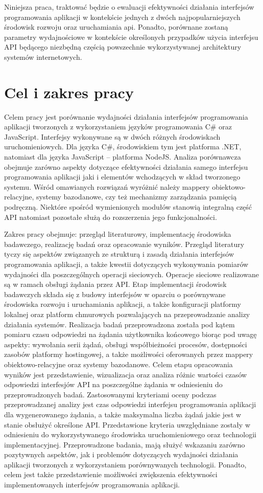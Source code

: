 Niniejsza praca, traktować będzie o ewaluacji efektywności działania interfejsów programowania aplikacji w kontekście jednych z dwóch najpopularniejszych środowisk rozwoju oraz uruchamiania api. Ponadto, porównane zostaną parametry wydajnościowe w kontekście określonych przypadków użycia interfejsu API będącego niezbędną częścią powszechnie wykorzystywanej architektury systemów internetowych.
\section{Cel i zakres pracy}
Celem pracy jest porównanie wydajności działania interfejsów programowania aplikacji tworzonych z wykorzystaniem języków programowania C\# oraz JavaScript. Interfejsy wykonywane są w dwóch różnych środowiskach uruchomieniowych. Dla języka C\#, środowiskiem tym jest platforma .NET, natomiast dla języka JavaScript -- platforma NodeJS. Analiza porównawcza obejmuje zarówno aspekty dotyczące efektywności działania samego interfejsu programowania aplikacji jaki i elementów wchodzących w skład tworzonego systemu. Wśród omawianych rozwiązań wyróżnić należy mappery obiektowo-relacyjne, systemy bazodanowe, czy też mechanizmy zarządzania pamięcią podręczną. Niektóre spośród wymienionych modułów stanowią integralną część API natomiast pozostałe służą do rozszerzenia jego funkcjonalności.

Zakres pracy obejmuje: przegląd literaturowy, implementację środowiska badawczego, realizację badań oraz opracowanie wyników. Przegląd literatury tyczy się aspektów związanych ze strukturą i zasadą działania interfejsów programowania aplikacji, a także kwestii dotyczących wykonywania pomiarów wydajności dla poszczególnych operacji sieciowych. Operacje sieciowe realizowane są w ramach obsługi żądania przez API. Etap implementacji środowisk badawczych składa się z budowy interfejsów w oparciu o porównywane środowiska rozwoju i uruchamiania aplikacji, a także konfiguracji platformy lokalnej oraz platform chmurowych pozwalających na przeprowadzanie analizy działania systemów. Realizacja badań przeprowadzona została pod kątem pomiaru czasu odpowiedzi na żądania użytkownika końcowego biorąc pod uwagę aspekty: wywołania serii żądań, obsługi współbieżności procesów, dostępności zasobów platformy hostingowej, a także możliwości oferowanych przez mappery obiektowo-relacyjne oraz systemy bazodanowe. Celem etapu opracowania wyników jest przedstawienie, wizualizacja oraz analiza różnic wartości czasów odpowiedzi interfesjów API na poszczególne żądania w odniesieniu do przeprowadzonych badań. Zastosowanymi kryteriami oceny podczas przeprowadzanej analizy jest czas odpowiedzi interfejsu programowania aplikacji dla wygenerowanego żądania, a także maksymalna liczba żądań jakie jest w stanie obsłużyć określone API. Przedstawione kryteria uwzględniane zostały w odniesieniu do wykorzystywanego środowiska uruchomieniowego oraz technologii implementacyjnej. Przeprowadzone badania, mają służyć wskazaniu zarówno pozytywnych aspektów, jak i problemów dotyczących wydajności działania aplikacji tworzonych z wykorzystaniem porównywanych technologii. Ponadto, celem jest także przedstawienie możliwości zwiększenia efektywności implementowanych interfejsów programowania aplikacji.
